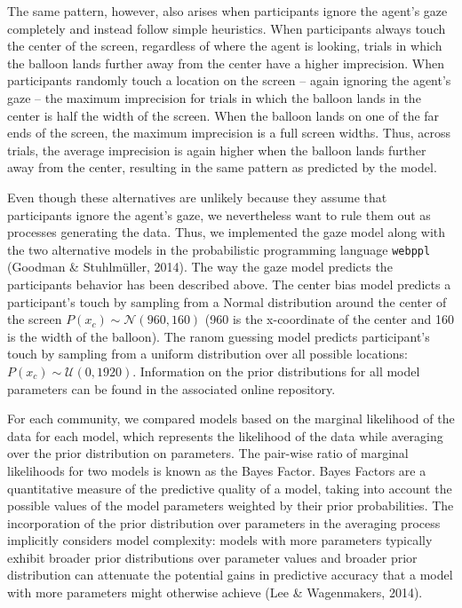 \documentclass[
  man,floatsintext]{apa7}
\begin{document}
The same pattern, however, also arises when participants ignore the agent's gaze completely and instead follow simple heuristics. When participants always touch the center of the screen, regardless of where the agent is looking, trials in which the balloon lands further away from the center have a higher imprecision. When participants randomly touch a location on the screen -- again ignoring the agent's gaze -- the maximum imprecision for trials in which the balloon lands in the center is half the width of the screen. When the balloon lands on one of the far ends of the screen, the maximum imprecision is a full screen widths. Thus, across trials, the average imprecision is again higher when the balloon lands further away from the center, resulting in the same pattern as predicted by the model.

Even though these alternatives are unlikely because they assume that participants ignore the agent's gaze, we nevertheless want to rule them out as processes generating the data. Thus, we implemented the gaze model along with the two alternative models in the probabilistic programming language \texttt{webppl} (Goodman \& Stuhlmüller, 2014). The way the gaze model predicts the participants behavior has been described above. The center bias model predicts a participant's touch by sampling from a Normal distribution around the center of the screen \(P(x_c) \sim \mathcal{N}(960, 160)\) (960 is the x-coordinate of the center and 160 is the width of the balloon). The ranom guessing model predicts participant's touch by sampling from a uniform distribution over all possible locations: \(P(x_c) \sim \mathcal{U}(0, 1920)\). Information on the prior distributions for all model parameters can be found in the associated online repository.

For each community, we compared models based on the marginal likelihood of the data for each model, which represents the likelihood of the data while averaging over the prior distribution on parameters. The pair-wise ratio of marginal likelihoods for two models is known as the Bayes Factor. Bayes Factors are a quantitative measure of the predictive quality of a model, taking into account the possible values of the model parameters weighted by their prior probabilities. The incorporation of the prior distribution over parameters in the averaging process implicitly considers model complexity: models with more parameters typically exhibit broader prior distributions over parameter values and broader prior distribution can attenuate the potential gains in predictive accuracy that a model with more parameters might otherwise achieve (Lee \& Wagenmakers, 2014).
\end{document}
